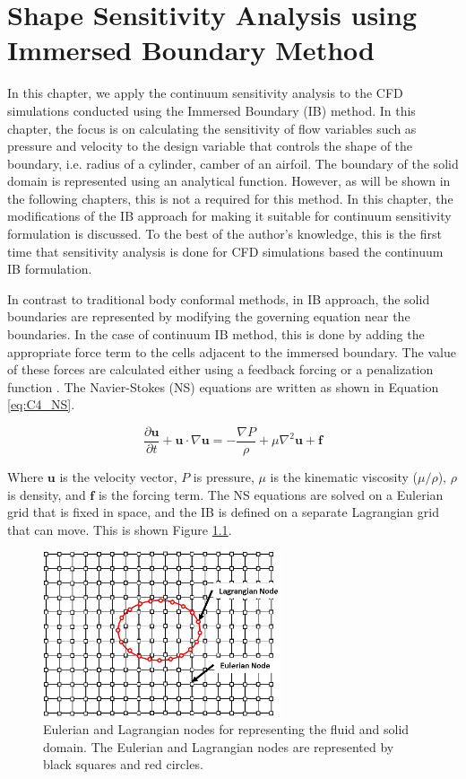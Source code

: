 \chapter{Shape Sensitivity Analysis using Immersed Boundary Method}
In this chapter, we apply the continuum sensitivity analysis to the CFD simulations conducted using the Immersed Boundary (IB) method. In this chapter, the focus is on calculating the sensitivity of flow variables such as pressure and velocity to the design variable that controls the shape of the boundary, i.e. radius of a cylinder, camber of an airfoil. The boundary of the solid domain is represented using an analytical function. However, as will be shown in the following chapters, this is not a required for this method. In this chapter, the modifications of the IB approach for making it suitable for continuum sensitivity formulation is discussed. To the best of the author's knowledge, this is the first time that sensitivity analysis is done for CFD simulations based the continuum IB formulation.

In contrast to traditional body conformal methods, in IB approach, the solid boundaries are represented by modifying the governing equation near the boundaries. In the case of continuum IB method, this is done by adding the appropriate force term to the cells adjacent to the immersed boundary. The value of these forces are calculated either using a feedback forcing \cite{goldstein1993modeling} or a penalization function \cite{arquis1984conditions}. The Navier-Stokes (NS) equations are written as shown in Equation \eqref{eq:C4_NS}.

\begin{equation}\label{eq:C4_NS}
    \frac{\partial \mathbf{u}}{\partial t} + \mathbf{u} \cdot \nabla \mathbf{u} = 
    -\frac{\nabla P}{\rho} + \mu \nabla^2 \mathbf{u} + \mathbf{f}
\end{equation}

Where $\mathbf{u}$ is the velocity vector, $P$ is pressure, $\mu$ is the kinematic viscosity ($\mu / \rho$), $\rho$ is density, and $\mathbf{f}$ is the forcing term. The NS equations are solved on a Eulerian grid that is fixed in space, and the IB is defined on a separate Lagrangian grid that can move. This is shown Figure \ref{fig:C4_lagrangianAndEulerianDomain}.

\begin{figure}[H]
    \centering
    \includegraphics[width=7.00cm]{Chapter_4/figure/lagrangian_and_eulerian_nodes.jpg}
    \caption{Eulerian and Lagrangian nodes for representing the fluid and solid domain. The Eulerian and Lagrangian nodes are represented by black squares and red circles.}
    \label{fig:C4_lagrangianAndEulerianDomain}
\end{figure}

